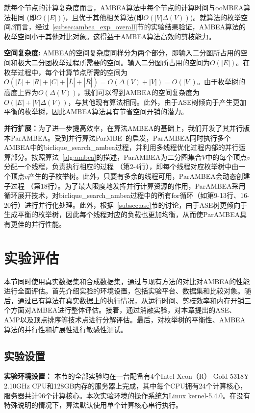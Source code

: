 就每个节点的计算复杂度而言，AMBEA算法中每个节点的计算时间与ooMBEA算法相同 (即$O(|E|)$)，且优于其他相关算法(即$O(|V|\Delta(V))$)。就算法的枚举空间$\beta$而言，经过~\ref{subsec:ambea_exp_overall}节的实验结果验证，AMBEA算法的枚举空间小于其他对比对象。这得益于AMBEA算法高效的剪枝能力。


\textbf{空间复杂度: } AMBEA的空间复杂度同样分为两个部分，即输入二分图所占用的空间和极大二分团枚举过程所需要的空间。输入二分图所占用的空间为$O(|E|)$。在枚举过程中，每个计算节点所需的空间为$O(|L|+|R|+|C|+|\overline{L}| + |\overline{R}|) = O(\Delta(V) + |V|) = O(|V|)$。由于枚举树的高度上界为$O(\Delta(V))$，我们可以得到AMBEA的空间复杂度为$O(|E|+|V|\Delta(V))$，与其他现有算法相同。此外，由于ASE树倾向于产生更加平衡的枚举树，因此AMBEA算法具有节省空间开销的潜力。

\textbf{并行扩展：}为了进一步提高效率，在算法AMBEA的基础上，我们开发了其并行版本ParAMBEA。受到并行算法ParMBE~\cite{parMBE19}的启发，ParAMBEA同时执行多个AMBEA中的\textsf{biclique\_search\_ambea}过程，并利用多线程优化过程内部的并行运算部分。按照算法~\ref{alg:ambea}的描述，ParAMBEA为二分图集合$V$中的每个顶点$v$分配一个线程，负责执行相应的过程 （第2-4行），即每个线程对应枚举树中由一个顶点$v$产生的子枚举树。此外，只要有多余的线程可用，ParAMBEA会动态创建子过程 （第18行）。为了最大限度地发挥并行计算资源的作用，ParAMBEA采用循环展开技术，对\textsf{biclique\_search\_ambea}过程中的所有for循环（如第9-13行、16-20行）进行并行化处理。此外，根据~\ref{subsec:ase}节的讨论，由于ASE树更倾向于生成平衡的枚举树，因此每个线程对应的负载也更加均衡，从而使ParAMBEA具有更佳的并行性能。


\section{实验评估}

本节同时使用真实数据集和合成数据集，通过与现有方法的对比对AMBEA的性能进行全面评估。首先介绍实验的环境设置，包括实验平台、数据集和比较对象。随后，通过已有算法在真实数据上的执行情况，从运行时间、剪枝效率和内存开销三个方面对AMBEA进行整体评估。接着，通过消融实验，对本章提出的ASE、AMP以及顶点排序等技术点进行分解评估。最后，对枚举树的平衡性、AMBEA算法的并行性和扩展性进行敏感性测试。

\subsection{实验设置}

\textbf{实验环境设置：} 本节的全部实验均在一台配备有4个Intel Xeon（R） Gold 5318Y 2.10GHz CPU和128GB内存的服务器上完成，其中每个CPU拥有24个计算核心，服务器共计96个计算核心。本次实验环境的操作系统为Linux kernel-5.4.0。在没有特殊说明的情况下，算法默认使用单个计算核心串行执行。

